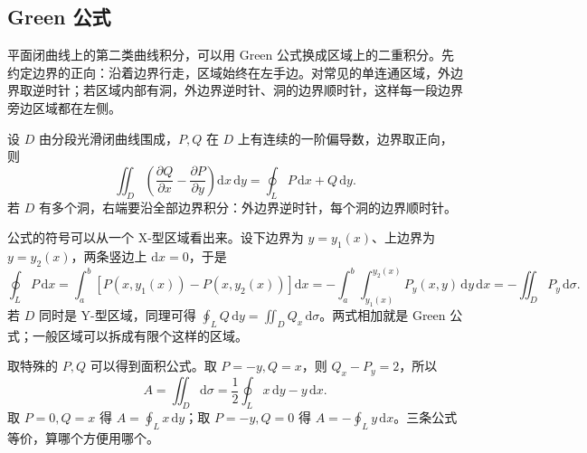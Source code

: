 \subsection{Green 公式}

平面闭曲线上的第二类曲线积分，可以用 Green 公式换成区域上的二重积分。先约定边界的正向：沿着边界行走，区域始终在左手边。对常见的单连通区域，外边界取逆时针；若区域内部有洞，外边界逆时针、洞的边界顺时针，这样每一段边界旁边区域都在左侧。

\begin{center}
\end{center}

设 $D$ 由分段光滑闭曲线围成，$P,Q$ 在 $D$ 上有连续的一阶偏导数，边界取正向，则
\[
    \iint_D\left(\frac{\partial Q}{\partial x}
    -\frac{\partial P}{\partial y}\right)\mathrm dx\,\mathrm dy
    =\oint_L P\,\mathrm dx+Q\,\mathrm dy .
\]
若 $D$ 有多个洞，右端要沿全部边界积分：外边界逆时针，每个洞的边界顺时针。

公式的符号可以从一个 X-型区域看出来。设下边界为 $y=y_1(x)$、上边界为 $y=y_2(x)$，两条竖边上 $\mathrm dx=0$，于是
\[
    \oint_L P\,\mathrm dx
    =\int_a^b\left[P(x,y_1(x))-P(x,y_2(x))\right]\mathrm dx
    =-\int_a^b\int_{y_1(x)}^{y_2(x)}P_y(x,y)\,\mathrm dy\,\mathrm dx
    =-\iint_D P_y\,\mathrm d\sigma .
\]
若 $D$ 同时是 Y-型区域，同理可得 $\oint_L Q\,\mathrm dy=\iint_D Q_x\,\mathrm d\sigma$。两式相加就是 Green 公式；一般区域可以拆成有限个这样的区域。

取特殊的 $P,Q$ 可以得到面积公式。取 $P=-y,Q=x$，则 $Q_x-P_y=2$，所以
\[
    A=\iint_D\mathrm d\sigma
    =\frac12\oint_L x\,\mathrm dy-y\,\mathrm dx .
\]
取 $P=0,Q=x$ 得 $A=\oint_L x\,\mathrm dy$；取 $P=-y,Q=0$ 得 $A=-\oint_L y\,\mathrm dx$。三条公式等价，算哪个方便用哪个。

